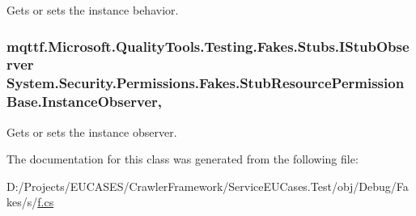 Gets or sets the instance behavior.

\hypertarget{class_system_1_1_security_1_1_permissions_1_1_fakes_1_1_stub_resource_permission_base_a06130f138181c881473ead53f3e7208b}{
\subsubsection[{Instance\-Observer}]{\setlength{\rightskip}{0pt plus 5cm}mqttf.\-Microsoft.\-Quality\-Tools.\-Testing.\-Fakes.\-Stubs.\-I\-Stub\-Observer System.\-Security.\-Permissions.\-Fakes.\-Stub\-Resource\-Permission\-Base.\-Instance\-Observer\hspace{0.3cm}{\ttfamily [get]}, {\ttfamily [set]}}}\label{class_system_1_1_security_1_1_permissions_1_1_fakes_1_1_stub_resource_permission_base_a06130f138181c881473ead53f3e7208b}


Gets or sets the instance observer.



The documentation for this class was generated from the following file\-:\begin{DoxyCompactItemize}
\item 
D\-:/\-Projects/\-E\-U\-C\-A\-S\-E\-S/\-Crawler\-Framework/\-Service\-E\-U\-Cases.\-Test/obj/\-Debug/\-Fakes/s/\hyperlink{s_2f_8cs}{f.\-cs}\end{DoxyCompactItemize}
